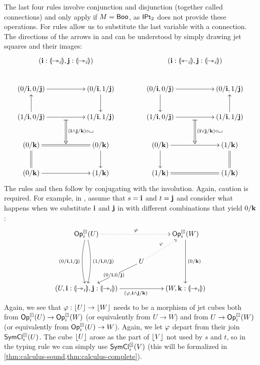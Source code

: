 \documentclass[a4paper]{article}
\begin{document}
The last four rules involve conjunction and disjunction (together called connections) and only apply if $M = \mathsf{Boo}$, as ${\mathsf{IPt}_2}$ does not provide these operations.
For rules allow us to substitute the last variable with a connection.
The directions of the arrows in  and  can be understood by simply drawing jet squares and their images:
\[
	\xymatrix{
		& {\mathclap{(\dm i : \rival{\jet_i}, \dm j : \rival{\jet_i})}}
		\\
		(0/\dm i, 0/\dm j)
			\ar[rr]
			\ar@{<-}[d]
		&&
		(0/\dm i, 1/\dm j)
			\ar[d]
		\\
		(1/\dm i, 0/\dm j)
			\ar[rr]
		& \ar@{|=>}[d]^{(\dm i \wedge \dm j / \dm k) \circ \loch} &
		(1/\dm i, 1/\dm j)
		\\
		(0/\dm k)
			\ar@{=}[rr]
			\ar@{=}[d]
		&&
		(0/\dm k)
			\ar[d]
		\\
		(0/\dm k)
			\ar[rr]
		&&
		(1/\dm k)
	}
	\qquad \qquad
	\xymatrix{
		& {\mathclap{(\dm i : \rival{\tej_i}, \dm j : \rival{\jet_i})}}
		\\
		(0/\dm i, 0/\dm j)
			\ar[rr]
			\ar[d]
		&&
		(0/\dm i, 1/\dm j)
			\ar@{<-}[d]
		\\
		(1/\dm i, 0/\dm j)
			\ar[rr]
		& \ar@{|=>}[d]^{(\dm i \vee \dm j / \dm k) \circ \loch} &
		(1/\dm i, 1/\dm j)
		\\
		(0/\dm k)
			\ar[rr]
			\ar[d]
		&&
		(1/\dm k)
			\ar@{=}[d]
		\\
		(1/\dm k)
			\ar@{=}[rr]
		&&
		(1/\dm k)
	}
\]
The rules  and  then follow by conjugating with the involution.
Again, caution is required.
For example, in , assume that $s = \mathbf{i}$ and $t = \mathbf{j}$ and consider what happens when we substitute $\mathbf{i}$ and $\mathbf{j}$ in  with different combinations that yield $0/\mathbf{k}$:
\[
	\xymatrix{
		\Opcube_i(U)
			\ar@/_/[dd]_{(0/\dm i, 1/\dm j)}
			\ar@/^/[dd]^{(1/\dm i, 0/\dm j)}
			\ar@{.>}[rr]^\vfi
		&& \Opcube_i(W)
			\ar[dd]^{(0/\dm k)}
		\\
		& U
			\ar[ld]|{(0/\dm i, 0/\dm j)}
			\ar@{.>}[ru]^\vfi
		\\
		(U, \dm i : \rival{\jet_i}, \dm j : \rival{\jet_i})
		\ar[rr]_{(\vfi, \dm i \wedge \dm j / \dm k)}
		&&
		(W, \dm k : \rival{\jet_i})
	}
\]
Again, we see that $\varphi : \mathopen{}\left\lfloor U \right\rfloor\mathclose{} \to \mathopen{}\left\lfloor W \right\rfloor\mathclose{}$ needs to be a morphism of jet cubes both from ${\mathsf{Op}}^\boxdot_i(U) \to {\mathsf{Op}}^\boxdot_i(W)$ (or equivalently from $U \to W$) and from $U \to {\mathsf{Op}}^\boxdot_i(W)$ (or equivalently from ${\mathsf{Op}}^\boxdot_i(U) \to W$). Again, we let $\varphi$ depart from their join $\mathsf{SymCl}^\boxdot_i(U)$.
The cube $\mathopen{}\left\lfloor U \right\rfloor\mathclose{}$ arose as the part of $\mathopen{}\left\lfloor V \right\rfloor\mathclose{}$ not used by $s$ and $t$, so in the typing rule we can simply use $\mathsf{SymCl}^\boxdot_i(V)$ (this will be formalized in \cref{thm:calculus-sound,thm:calculus-complete}).
\end{document}
